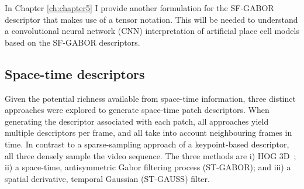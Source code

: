 In Chapter \ref{ch:chapter5} I provide another formulation for the SF-GABOR descriptor that makes use of a tensor notation. This will be needed to understand a convolutional neural network (CNN) interpretation of artificial place cell models based on the SF-GABOR descriptors.

\subsection{Space-time descriptors}

Given the potential richness available from space-time information, three distinct approaches were explored to generate space-time patch descriptors.  When generating the descriptor associated with each patch, all  approaches yield multiple descriptors per frame, and all take into account neighbouring frames in time.  In contrast to a sparse-sampling approach of a keypoint-based descriptor, all three densely sample the video sequence.  The three methods are i) HOG 3D~\cite{Klaser2008}; ii) a space-time, antisymmetric Gabor filtering process (ST-GABOR); and iii) a spatial derivative, temporal Gaussian (ST-GAUSS) filter.

